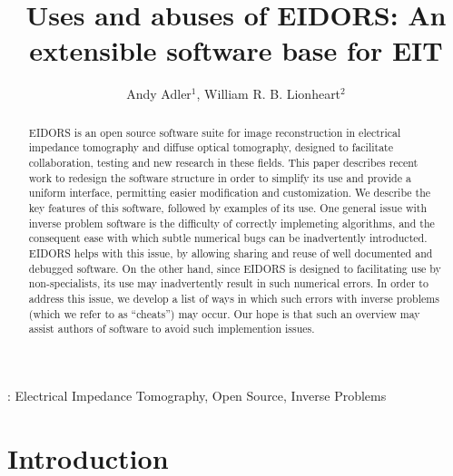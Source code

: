 \documentclass[12pt]{iopart}
\begin{document}
\title{Uses and abuses of EIDORS: An extensible software base for EIT}
\author{Andy Adler$^1$, William R. B. Lionheart$^2$}
\address{$^1$ School of Information Technology and Engineering,
              University of Ottawa, Canada}
\address{$^2$ School of Mathematics, University of Manchester, U.K.}

\begin{abstract} %

EIDORS is an open source software suite for image reconstruction in
electrical impedance tomography and diffuse optical tomography,
designed to facilitate collaboration, testing and new research
in these fields.  This paper describes recent work to
redesign the software structure in order to simplify its use
and provide a uniform interface,
permitting easier modification and customization.
We describe the key features of this software, followed by
examples of its use.
One general issue with inverse problem software is the difficulty
of correctly implemeting algorithms, and the consequent ease with
which subtle numerical bugs can be inadvertently introducted.
EIDORS helps with this issue, by allowing sharing and reuse
of well documented and debugged software. On the other hand, 
since EIDORS is designed to facilitating use by non-specialists,
its use may inadvertently result in such numerical errors.
In order to address this issue, we develop a list of ways in
which such errors with inverse problems
 (which we refer to as ``cheats'') may occur.
Our hope is that such an overview may assist authors
of software to avoid such implemention issues.


\end{abstract}
:
Electrical Impedance Tomography,
Open Source,
Inverse Problems

\section{Introduction}
\end{document}
